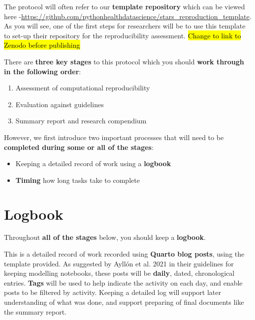 The protocol will often refer to our \textbf{template repository} which can be viewed here -\url{https://github.com/pythonhealthdatascience/stars_reproduction_template}. As you will see, one of the first steps for researchers will be to use this template to set-up their repository for the reproducibility assessment. \hl{Change to link to Zenodo before publishing}

There are \textbf{three key stages} to this protocol which you should \textbf{work through in the following order}:
\begin{enumerate}
    \item Assessment of computational reproducibility
    \item Evaluation against guidelines
    \item Summary report and research compendium
\end{enumerate}

However, we first introduce two important processes that will need to be \textbf{completed during some or all of the stages}:
\begin{itemize}
    \item Keeping a detailed record of work using a \textbf{logbook}
    \item \textbf{Timing} how long tasks take to complete
\end{itemize}

\newpage
\section{Logbook}

Throughout \textbf{all of the stages} below, you should keep a \textbf{logbook}.

This is a detailed record of work recorded using \textbf{Quarto blog posts}, using the template provided. As suggested by Ayllón et al. 2021\autocite{ayllon_keeping_2021} in their guidelines for keeping modelling notebooks, these posts will be \textbf{daily}, dated, chronological entries. \textbf{Tags} will be used to help indicate the activity on each day, and enable posts to be filtered by activity. Keeping a detailed log will support later understanding of what was done, and support preparing of final documents like the summary report.

